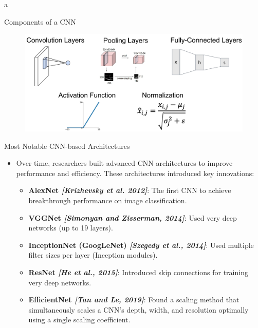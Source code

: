 a\documentclass[10pt]{beamer}
\theoremstyle{remark}
\theoremstyle{definition}
\begin{document}
\begin{frame}{Components of a CNN}
\begin{figure}
\centering
\includegraphics[width=1.0\textwidth,height=0.9\textheight,keepaspectratio]{./images/components.png}
\end{figure}
    
\end{frame}

\begin{frame}{Most Notable CNN-based Architectures}
\begin{itemize}
    \item Over time, researchers built advanced CNN architectures to improve performance and efficiency. These architectures introduced key innovations:
    \begin{itemize}
    \item \textbf{AlexNet \emph{[Krizhevsky et al. 2012]}}:  The first CNN to achieve breakthrough performance on image classification.
    \item \textbf{VGGNet \emph{[Simonyan and Zisserman, 2014]}}: Used very deep networks (up to 19 layers).
        \item \textbf{InceptionNet (GoogLeNet) \emph{[Szegedy et al., 2014]}}: Used multiple filter sizes per layer (Inception modules).
    \item \textbf{ResNet \emph{[He et al., 2015]}}: Introduced skip connections for training very deep networks.
    \item \textbf{EfficientNet \emph{[Tan and Le, 2019]}}: Found a scaling method that  simultaneously scales a CNN’s depth, width, and resolution optimally using a single scaling coefficient.
    \end{itemize}
\end{itemize}
    
\end{frame}
\end{document}
